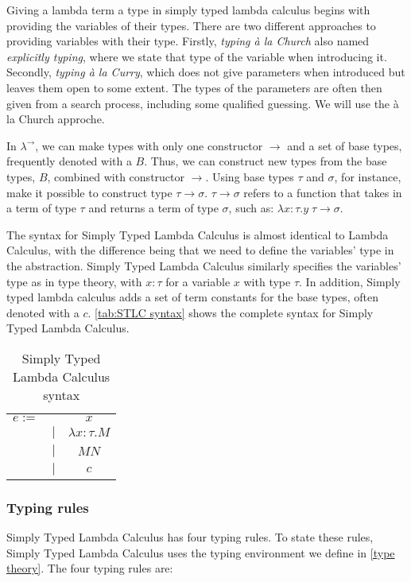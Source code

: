 \para
Giving a lambda term a type in simply typed lambda calculus begins with providing the variables of their types.  There are two different approaches to providing variables with their type. Firstly, \emph{typing à la Church} also named \emph{explicitly typing}, where we state that type of the variable when introducing it. Secondly, \emph{typing à la Curry}, which does not give parameters when introduced but leaves them open to some extent. The types of the parameters are often then given from a search process, including some qualified guessing. We will use the à la Church approche.

\para
In $\lambda^\rightarrow$, we can make types with only one constructor $\rightarrow$ and a set of base types, frequently denoted with a $B$. Thus, we can construct new types from the base types, $B$, combined with constructor $\rightarrow$. Using base types $\tau$ and $\sigma$, for instance, make it possible to construct type $\tau \rightarrow \sigma$. $\tau \rightarrow \sigma$ refers to a function that takes in a term of type $\tau$ and returns a term of type $\sigma$, such as: $\lambda x:\tau. y \; \tau \rightarrow \sigma$. 

\para
The syntax for Simply Typed Lambda Calculus is almost identical to Lambda Calculus, with the difference being that we need to define the variables' type in the abstraction. Simply Typed Lambda Calculus similarly specifies the variables' type as in type theory, with $x:\tau$ for a variable $x$ with type $\tau$. In addition, Simply typed lambda calculus adds a set of term constants for the base types, often denoted with a $c$. \autoref{tab:STLC syntax} shows the complete syntax for Simply Typed Lambda Calculus.


\begin{table}[]
    \centering
    \begin{tabular}{c c c}
         $e :=$&  & $x$\\
         & $|$ & $\lambda x:\tau.M$ \\
         & $|$ &  $M N$ \\
         & $|$ &  $c$ \\
    \end{tabular}
    \caption{Simply Typed Lambda Calculus syntax}
    \label{tab:STLC syntax}
\end{table}

\subsubsection{Typing rules}
Simply Typed Lambda Calculus has four typing rules. To state these rules, Simply Typed Lambda Calculus uses the typing environment we define in \autoref{type theory}. The four typing rules are:

